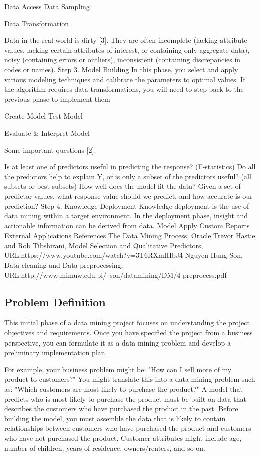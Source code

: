 Data Access
Data Sampling

Data Transformation

Data in the real world is dirty [3]. They are often incomplete (lacking attribute values, lacking certain attributes of interest, or containing only aggregate data), noisy (containing errors or outliers), inconsistent (containing discrepancies in codes or names). Step 3. Model Building In this phase, you select and apply various modeling techniques and calibrate the parameters to optimal values. If the algorithm requires data transformations, you will need to step back to the previous phase to implement them

Create Model
Test Model

Evaluate & Interpret Model

Some important questions [2]:

Is at least one of predictors useful in predicting the response? (F-statistics)
Do all the predictors help to explain Y, or is only a subset of the predictors useful? (all subsets or best subsets)
How well does the model fit the data?
Given a set of predictor values, what response value should we predict, and how accurate is our prediction?
Step 4. Knowledge Deployment Knowledge deployment is the use of data mining within a target environment. In the deployment phase, insight and actionable information can be derived from data.
Model Apply
Custom Reports
External Applications
References
The Data Mining Process, Oracle
Trevor Hastie and Rob Tibshirani, Model Selection and Qualitative Predictors, URL:https://www.youtube.com/watch?v=3T6RXmIHbJ4
Nguyen Hung Son, Data cleaning and Data preprocessing, URL:http://www.mimuw.edu.pl/~son/datamining/DM/4-preprocess.pdf

\subsection{Problem Definition}

This initial phase of a data mining project focuses on understanding the project objectives and requirements. Once you have specified the project from a business perspective, you can formulate it as a data mining problem and develop a preliminary implementation plan.

For example, your business problem might be: "How can I sell more of my product to customers?" You might translate this into a data mining problem such as: "Which customers are most likely to purchase the product?" A model that predicts who is most likely to purchase the product must be built on data that describes the customers who have purchased the product in the past. Before building the model, you must assemble the data that is likely to contain relationships between customers who have purchased the product and customers who have not purchased the product. Customer attributes might include age, number of children, years of residence, owners/renters, and so on.

